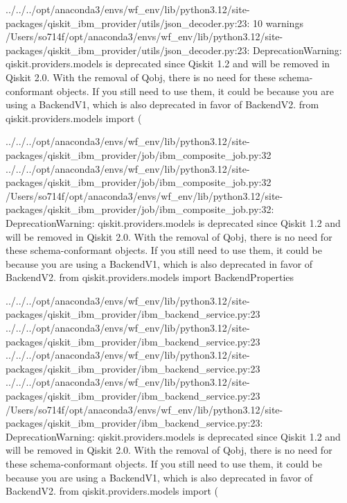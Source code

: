../../../opt/anaconda3/envs/wf_env/lib/python3.12/site-packages/qiskit_ibm_provider/utils/json_decoder.py:23: 10 warnings
  /Users/so714f/opt/anaconda3/envs/wf_env/lib/python3.12/site-packages/qiskit_ibm_provider/utils/json_decoder.py:23: DeprecationWarning: qiskit.providers.models is deprecated since Qiskit 1.2 and will be removed in Qiskit 2.0. With the removal of Qobj, there is no need for these schema-conformant objects. If you still need to use them, it could be because you are using a BackendV1, which is also deprecated in favor of BackendV2.
    from qiskit.providers.models import (

../../../opt/anaconda3/envs/wf_env/lib/python3.12/site-packages/qiskit_ibm_provider/job/ibm_composite_job.py:32
../../../opt/anaconda3/envs/wf_env/lib/python3.12/site-packages/qiskit_ibm_provider/job/ibm_composite_job.py:32
  /Users/so714f/opt/anaconda3/envs/wf_env/lib/python3.12/site-packages/qiskit_ibm_provider/job/ibm_composite_job.py:32: DeprecationWarning: qiskit.providers.models is deprecated since Qiskit 1.2 and will be removed in Qiskit 2.0. With the removal of Qobj, there is no need for these schema-conformant objects. If you still need to use them, it could be because you are using a BackendV1, which is also deprecated in favor of BackendV2.
    from qiskit.providers.models import BackendProperties

../../../opt/anaconda3/envs/wf_env/lib/python3.12/site-packages/qiskit_ibm_provider/ibm_backend_service.py:23
../../../opt/anaconda3/envs/wf_env/lib/python3.12/site-packages/qiskit_ibm_provider/ibm_backend_service.py:23
../../../opt/anaconda3/envs/wf_env/lib/python3.12/site-packages/qiskit_ibm_provider/ibm_backend_service.py:23
../../../opt/anaconda3/envs/wf_env/lib/python3.12/site-packages/qiskit_ibm_provider/ibm_backend_service.py:23
  /Users/so714f/opt/anaconda3/envs/wf_env/lib/python3.12/site-packages/qiskit_ibm_provider/ibm_backend_service.py:23: DeprecationWarning: qiskit.providers.models is deprecated since Qiskit 1.2 and will be removed in Qiskit 2.0. With the removal of Qobj, there is no need for these schema-conformant objects. If you still need to use them, it could be because you are using a BackendV1, which is also deprecated in favor of BackendV2.
    from qiskit.providers.models import (

